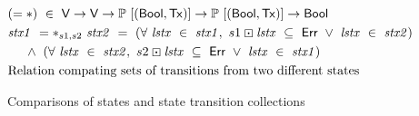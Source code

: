 \begin{figure*}[htb]
\begin{align*}
    \nextdef
    & (=*) ~\in~ \V \to \V \to \powerset{[(\Bool, \Tx)]} \to \powerset{[(\Bool, \Tx)]} \to \Bool \\
    & \var{stx1} ~=*_{s1,s2}~ \var{stx2} ~=~
     (\forall~\var{lstx}~\in~\var{stx1},~s1\boxdot\var{lstx}~\subseteq~\Err~\vee~\var{lstx}~\in~\var{stx2}) \\
    & ~~~~ \wedge~ (\forall~\var{lstx}~\in~\var{stx2},~s2\boxdot\var{lstx}~\subseteq~\Err~\vee~\var{lstx}~\in~\var{stx1}) \\
    & \text{Relation compating sets of transitions from two different states} \\
  \end{align*}
  \caption{Comparisons of states and state transition collections}
  \label{fig:ledger-aux}
\end{figure*}
